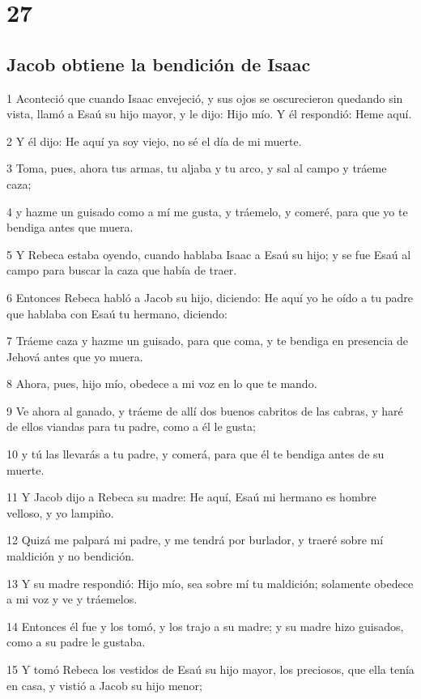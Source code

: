 \chapter{27}

\section*{Jacob obtiene la bendición de Isaac}

\par 1 Aconteció que cuando Isaac envejeció, y sus ojos se oscurecieron quedando sin vista, llamó a Esaú su hijo mayor, y le dijo: Hijo mío. Y él respondió: Heme aquí.
\par 2 Y él dijo: He aquí ya soy viejo, no sé el día de mi muerte.
\par 3 Toma, pues, ahora tus armas, tu aljaba y tu arco, y sal al campo y tráeme caza;
\par 4 y hazme un guisado como a mí me gusta, y tráemelo, y comeré, para que yo te bendiga antes que muera.
\par 5 Y Rebeca estaba oyendo, cuando hablaba Isaac a Esaú su hijo; y se fue Esaú al campo para buscar la caza que había de traer.
\par 6 Entonces Rebeca habló a Jacob su hijo, diciendo: He aquí yo he oído a tu padre que hablaba con Esaú tu hermano, diciendo:
\par 7 Tráeme caza y hazme un guisado, para que coma, y te bendiga en presencia de Jehová antes que yo muera.
\par 8 Ahora, pues, hijo mío, obedece a mi voz en lo que te mando.
\par 9 Ve ahora al ganado, y tráeme de allí dos buenos cabritos de las cabras, y haré de ellos viandas para tu padre, como a él le gusta;
\par 10 y tú las llevarás a tu padre, y comerá, para que él te bendiga antes de su muerte.
\par 11 Y Jacob dijo a Rebeca su madre: He aquí, Esaú mi hermano es hombre velloso, y yo lampiño.
\par 12 Quizá me palpará mi padre, y me tendrá por burlador, y traeré sobre mí maldición y no bendición.
\par 13 Y su madre respondió: Hijo mío, sea sobre mí tu maldición; solamente obedece a mi voz y ve y tráemelos.
\par 14 Entonces él fue y los tomó, y los trajo a su madre; y su madre hizo guisados, como a su padre le gustaba.
\par 15 Y tomó Rebeca los vestidos de Esaú su hijo mayor, los preciosos, que ella tenía en casa, y vistió a Jacob su hijo menor;
